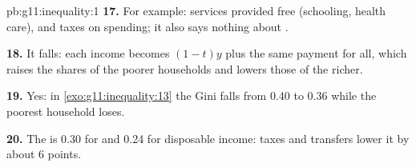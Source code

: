 \begin{solution}{pb:g11:inequality:1}
\textbf{17.} For example: services provided free (schooling, health care), and taxes on spending; it also says nothing about .

\textbf{18.} It falls: each income becomes $(1 - t)y$ plus the same payment for all, which raises the shares of the poorer households and lowers those of the richer.

\textbf{19.} Yes: in \cref{exo:g11:inequality:13} the Gini falls from 0.40 to 0.36 while the poorest household loses.

\textbf{20.} The  is 0.30 for  and 0.24 for disposable income: taxes and transfers lower it by about 6 points.
\end{solution}
